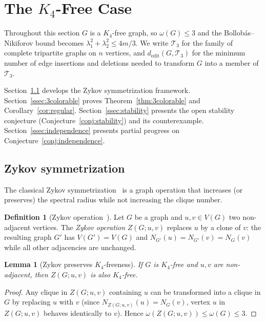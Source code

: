 \documentclass[preprint,12pt]{elsarticle}
\theoremstyle{plain}
\newtheorem{lemma}[theorem]{Lemma}
\theoremstyle{definition}
\newtheorem{definition}[theorem]{Definition}
\newcommand{\dedit}{d_{\mathrm{edit}}}
\begin{document}
\section{The $K_4$-Free Case}
\label{sec:K4free}

Throughout this section $G$ is a $K_4$-free graph, so $\omega(G) \leq 3$
and the Bollob\'as--Nikiforov bound becomes $\lambda_1^2 + \lambda_2^2 \leq 4m/3$.
We write $\mathcal{T}_3$ for the family of complete tripartite graphs on $n$
vertices, and $\dedit(G, \mathcal{T}_3)$ for the minimum number of edge
insertions and deletions needed to transform $G$ into a member of $\mathcal{T}_3$.

Section~\ref{ssec:zykov} develops the Zykov symmetrization framework.
Section~\ref{ssec:3colorable} proves Theorem~\ref{thm:3colorable} and
Corollary~\ref{cor:regular}.
Section~\ref{ssec:stability} presents the open stability conjecture
(Conjecture~\ref{conj:stability}) and its counterexample.
Section~\ref{ssec:independence} presents partial progress on
Conjecture~\ref{conj:independence}.

\subsection{Zykov symmetrization}
\label{ssec:zykov}

The classical Zykov symmetrization~\cite{Zykov1949} is a graph operation
that increases (or preserves) the spectral radius while not increasing the
clique number.

\begin{definition}[Zykov operation~\cite{Zykov1949}]
  \label{def:zykov}
  Let $G$ be a graph and $u, v \in V(G)$ two non-adjacent vertices.
  The \emph{Zykov operation} $Z(G; u,v)$ replaces $u$ by a clone of $v$:
  the resulting graph $G'$ has $V(G') = V(G)$ and
  $N_{G'}(u) = N_{G'}(v) = N_G(v)$
  while all other adjacencies are unchanged.
\end{definition}

\begin{lemma}[Zykov preserves $K_4$-freeness]
  \label{lem:zykov-kfree}
  If $G$ is $K_4$-free and $u,v$ are non-adjacent, then $Z(G;u,v)$ is also
  $K_4$-free.
\end{lemma}

\begin{proof}
Any clique in $Z(G;u,v)$ containing $u$ can be transformed into a clique
in $G$ by replacing $u$ with $v$ (since $N_{Z(G;u,v)}(u) = N_G(v)$, vertex $u$
in $Z(G;u,v)$ behaves identically to $v$).
Hence $\omega(Z(G;u,v)) \leq \omega(G) \leq 3$.
\end{proof}
\end{document}

